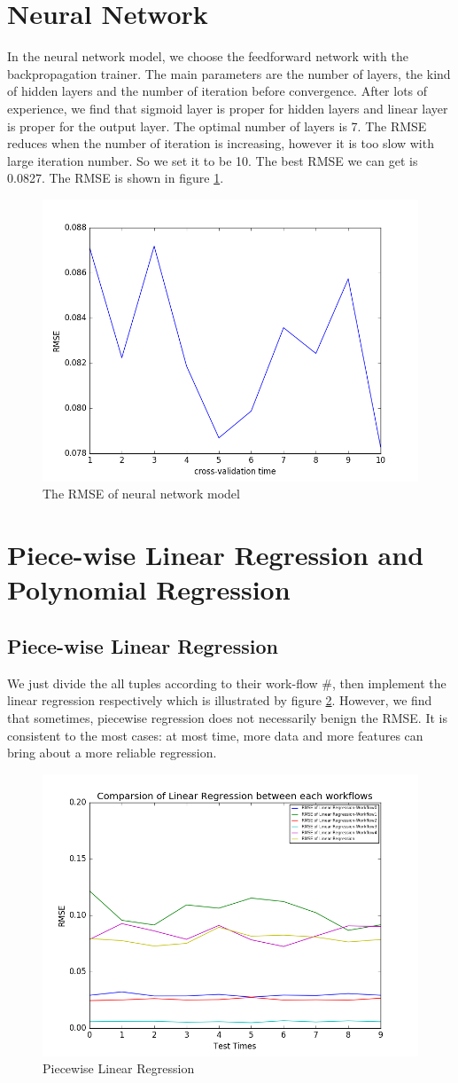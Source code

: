 \documentclass{article}
\begin{document}
\section{Neural Network}
In the neural network model, we choose the feedforward network with the backpropagation trainer. The main parameters are the number of layers, the kind of hidden layers and the number of iteration before convergence. After lots of experience, we find that sigmoid layer is proper for hidden layers and linear layer is proper for the output layer. The optimal number of layers is 7. The RMSE reduces when the number of iteration is increasing, however it is too slow with large iteration number. So we set it to be 10. The best RMSE we can get is 0.0827. The RMSE is shown in figure \ref{fig:nn}.
\begin{figure}[htbp]
\centering
\includegraphics[width=.6\textwidth]{nn.png}
\caption{The RMSE of neural network model}
\label{fig:nn}
\end{figure}
\section{Piece-wise Linear Regression and Polynomial Regression}
\subsection{Piece-wise Linear Regression}
We just divide the all tuples according to their work-flow \#,  then implement the linear regression respectively which is illustrated by figure \ref{fig:wf}. However, we find that sometimes, piecewise regression does not necessarily benign the RMSE. It is consistent to the most cases: at most time, more data and more features can bring about a more reliable regression.
\begin{figure}[htbp]
\centering
\includegraphics[width=.6\textwidth]{wf.png}
\caption{Piecewise Linear Regression}
\label{fig:wf}
\end{figure}
\end{document}

